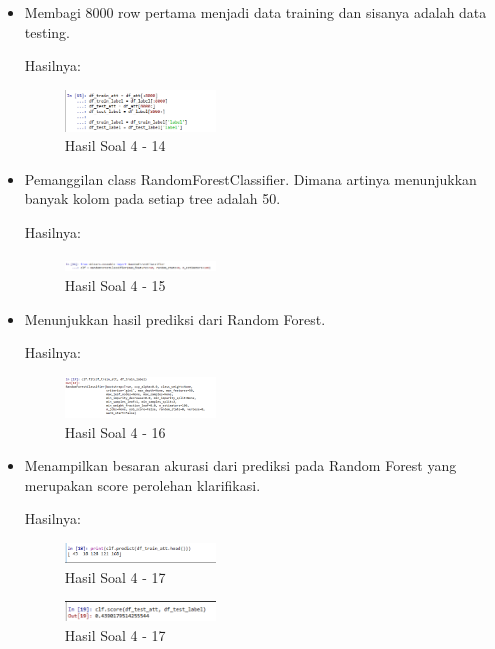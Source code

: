 \begin{enumerate}
\begin{itemize}
\item Membagi 8000 row pertama menjadi data training dan sisanya adalah data testing.

Hasilnya:
\begin{figure}[H]
	\centering
		\includegraphics[width=4cm]{figures/1174054/3/20.png}
		\caption{Hasil Soal 4 - 14}
\end{figure}
		
\item Pemanggilan class RandomForestClassifier. Dimana artinya menunjukkan banyak kolom pada setiap tree adalah 50.

Hasilnya:
\begin{figure}[H]
	\centering
		\includegraphics[width=4cm]{figures/1174054/3/21.png}
		\caption{Hasil Soal 4 - 15}
\end{figure}
		
\item Menunjukkan hasil prediksi dari Random Forest.

Hasilnya:
\begin{figure}[H]
	\centering
		\includegraphics[width=4cm]{figures/1174054/3/22.png}
		\caption{Hasil Soal 4 - 16}
\end{figure}

\item Menampilkan besaran akurasi dari prediksi pada Random Forest yang merupakan score perolehan klarifikasi.

Hasilnya:
\begin{figure}[H]
	\centering
		\includegraphics[width=4cm]{figures/1174054/3/23.png}
		\caption{Hasil Soal 4 - 17}
\end{figure}
\begin{figure}[H]
	\centering
		\includegraphics[width=4cm]{figures/1174054/3/24.png}
		\caption{Hasil Soal 4 - 17}
\end{figure}
\end{itemize}


\end{enumerate}
